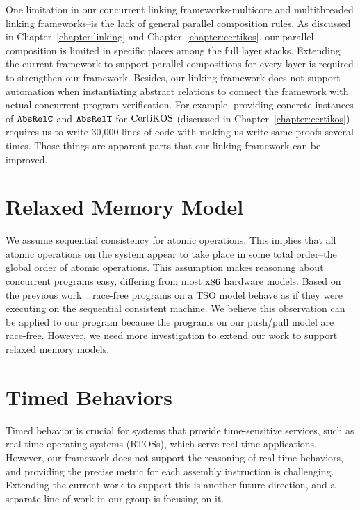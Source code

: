 One limitation in our concurrent linking frameworks-multicore and multithreaded linking frameworks--is the lack of general parallel composition rules. 
As discussed in Chapter~\ref{chapter:linking} and Chapter~\ref{chapter:certikos}, 
our parallel composition is limited in specific places among the full layer stacks. Extending the current framework to support parallel compositions for every layer is required to strengthen our framework.
Besides, our linking framework does not support automation when instantiating abstract relations to connect the framework with actual concurrent program verification.
For example, providing concrete instances of ${{\mathrm{\texttt{AbsRelC}}}}$ and ${{\mathrm{\texttt{AbsRelT}}}}$ for $\mathrm{CertiKOS}$ (discussed in Chapter~\ref{chapter:certikos}) requires us to write 30,000 lines of code with making us write same proofs several times. 
Those things are apparent parts that our linking framework can be improved. 


\section{Relaxed Memory Model}

We assume sequential consistency for atomic operations. 
This implies that all atomic operations on the system appear to take place in some total order--the global order of atomic operations.
This assumption makes reasoning about concurrent programs easy, differing from most $\mathrm{x86}$
 hardware models. Based on the previous work~\cite{sevcik13}, 
race-free programs on a TSO model behave as if they were executing on the sequential consistent machine. 
We believe this observation can be applied to our program because the programs on our push/pull model are race-free. 
However, we need more investigation to extend our work to support relaxed memory models.


\section{Timed Behaviors}

Timed behavior is crucial for systems that provide time-sensitive services, such as real-time operating systems (RTOSs), 
which serve real-time applications. However, our framework does not support the reasoning of real-time behaviors, 
and providing the precise metric for each assembly instruction is challenging. Extending the current work to support 
this is another future direction, and a separate line of work in our group is focusing on it.


